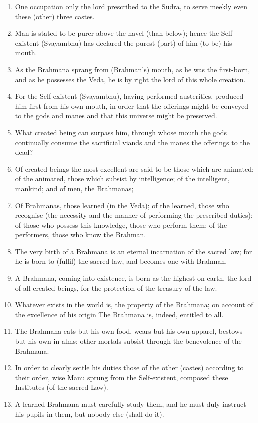 \begin{enumerate}
\item One occupation only the lord prescribed to the Sudra, to serve meekly even these (other) three castes.
\item Man is stated to be purer above the navel (than below); hence the Self-existent (Svayambhu) has declared the purest (part) of him (to be) his mouth.
\item As the Brahmana sprang from (Brahman's) mouth, as he was the first-born, and as he possesses the Veda, he is by right the lord of this whole creation.
\item For the Self-existent (Svayambhu), having performed austerities, produced him first from his own mouth, in order that the offerings might be conveyed to the gods and manes and that this universe might be preserved.
\item What created being can surpass him, through whose mouth the gods continually consume the sacrificial viands and the manes the offerings to the dead?
\item Of created beings the most excellent are said to be those which are animated; of the animated, those which subsist by intelligence; of the intelligent, mankind; and of men, the Brahmanas;
\item Of Brahmanas, those learned (in the Veda); of the learned, those who recognise (the necessity and the manner of performing the prescribed duties); of those who possess this knowledge, those who perform them; of the performers, those who know the Brahman.
\item The very birth of a Brahmana is an eternal incarnation of the sacred law; for he is born to (fulfil) the sacred law, and becomes one with Brahman.
\item A Brahmana, coming into existence, is born as the highest on earth, the lord of all created beings, for the protection of the treasury of the law.
\item Whatever exists in the world is, the property of the Brahmana; on account of the excellence of his origin The Brahmana is, indeed, entitled to all.
\item The Brahmana eats but his own food, wears but his own apparel, bestows but his own in alms; other mortals subsist through the benevolence of the Brahmana.
\item In order to clearly settle his duties those of the other (castes) according to their order, wise Manu sprung from the Self-existent, composed these Institutes (of the sacred Law).
\item A learned Brahmana must carefully study them, and he must duly instruct his pupils in them, but nobody else (shall do it).

\end{enumerate}
